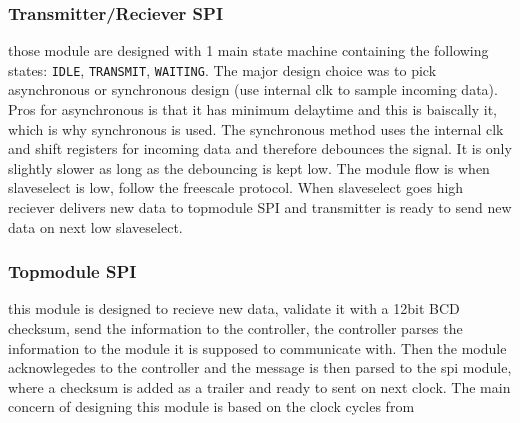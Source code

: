 \subsubsection{Transmitter/Reciever SPI}
those module are designed with 1 main state machine containing the following states: \texttt{IDLE}, \texttt{TRANSMIT}, \texttt{WAITING}. The major design choice was to pick asynchronous or synchronous design (use internal clk to sample incoming data). Pros for asynchronous is that it has minimum delaytime and this is baiscally it, which is why synchronous is used. The synchronous method uses the internal clk and shift registers for incoming data and therefore debounces the signal. It is only slightly slower as long as the debouncing is kept low. The module flow is when slaveselect is low, follow the freescale protocol. When slaveselect goes high reciever delivers new data to topmodule SPI and transmitter is ready to send new data on next low slaveselect.

\subsubsection{Topmodule SPI}
this module is designed to recieve new data, validate it with a 12bit BCD checksum, send the information to the controller, the controller parses the information to the module it is supposed to communicate with. Then the module acknowlegedes to the controller and the message is then parsed to the spi module, where a checksum is added as a trailer and ready to sent on next clock. The main concern of designing this module is based on the clock cycles from 







